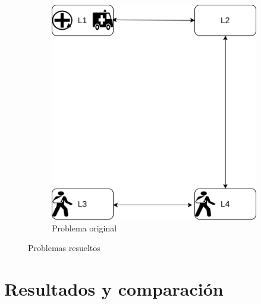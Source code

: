 \documentclass[a4paper,12pt]{article}
\begin{document}
\begin{figure}
\begin{subfigure}[b]{0.45\textwidth}
         \includegraphics[width=\textwidth]{im/original}
         \caption{Problema original}
         \label{fig:var2}
     \end{subfigure}
        \caption{Problemas resueltos}
        \label{fig:problemas}
\end{figure}




\section{Resultados y comparación}
\end{document}
